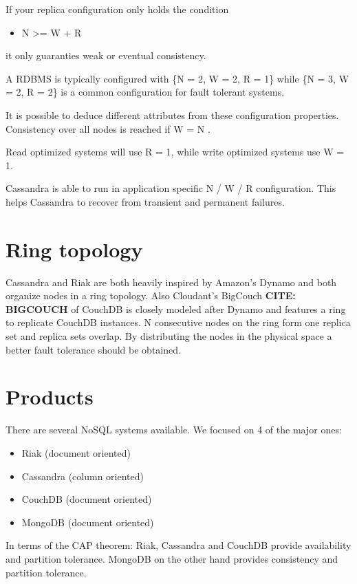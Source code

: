 If your replica configuration only holds the condition

\begin{itemize}
\item
  N \textgreater{}= W + R
\end{itemize}
it only guaranties weak or eventual consistency.

A RDBMS is typically configured with \{N = 2, W = 2, R = 1\} while
\{N = 3, W = 2, R = 2\} is a common configuration for fault
tolerant systems.

It is possible to deduce different attributes from these
configuration properties. Consistency over all nodes is reached if
W = N .

Read optimized systems will use R = 1, while write optimized
systems use W = 1.

Cassandra is able to run in application specific N / W / R
configuration. This helps Cassandra to recover from transient and
permanent failures.

\section{Ring topology}

Cassandra and Riak are both heavily inspired by Amazon's Dynamo and
both organize nodes in a ring topology. Also Cloudant's BigCouch
\textbf{CITE: BIGCOUCH} of CouchDB is closely modeled after Dynamo
and features a ring to replicate CouchDB instances. N consecutive
nodes on the ring form one replica set and replica sets overlap. By
distributing the nodes in the physical space a better fault
tolerance should be obtained.

\section{Products}

There are several NoSQL systems available. We focused on 4 of the
major ones:

\begin{itemize}
\item
  Riak (document oriented)
\item
  Cassandra (column oriented)
\item
  CouchDB (document oriented)
\item
  MongoDB (document oriented)
\end{itemize}
In terms of the CAP theorem: Riak, Cassandra and CouchDB provide
availability and partition tolerance. MongoDB on the other hand
provides consistency and partition tolerance.

